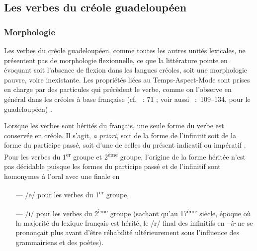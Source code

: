 \documentclass[output=paper]{langsci/langscibook}
\begin{document}
\subsection{Les verbes du créole
guadeloupéen}\label{subsection:VilloingDeglas:les-verbes-du-creole-guadeloupeen}

\subsubsection{Morphologie}\label{subsubsection:VilloingDeglas:morphologie}

Les verbes du créole guadeloupéen, comme toutes les autres unités
lexicales, ne présentent pas de morphologie flexionnelle, ce que la
littérature pointe en évoquant soit l'absence de flexion dans les
langues créoles, soit une morphologie pauvre, voire inexistante. Les
propriétés liées au Temps-Aspect-Mode sont prises en charge par des
particules qui précèdent le verbe, comme on l'observe en général dans
les créoles à base française %
(cf.  %
\citealt{Valdman78,Bernabe87,Mufwene89,HazaelMassieux2002}%
%
~: 71 ; voir aussi %
\citealt{Germain76}%
~:~109--134, pour le guadeloupéen)
%
.

Lorsque les verbes sont hérités du français, une seule forme du verbe
est conservée en créole. Il s'agit, \emph{a priori}, soit de la forme de
l'infinitif soit de la forme du participe passé, soit d'une de celles du
présent indicatif ou impératif %
\citep[110]{Germain76}%
%
. Pour les verbes du
1\textsuperscript{er} groupe et 2\textsuperscript{ème} groupe, l'origine
de la forme héritée n'est pas décidable puisque les formes du participe
passé et de l'infinitif sont homonymes à l'oral avec une finale en

\begin{itemize}

\item[---]
  /e/ pour les verbes du 1\textsuperscript{er} groupe,
\item[---]
   /i/ pour les verbes du 2\textsuperscript{ème} groupe (sachant qu'au
  17\textsuperscript{ème} siècle, époque où la majorité du lexique
  français est hérité, le /r/ final des infinitifs en --\emph{ir} ne se
  prononçait plus avant d'être réhabilité ultérieurement sous
  l'influence des grammairiens et des poètes).
\end{itemize}
\end{document}
